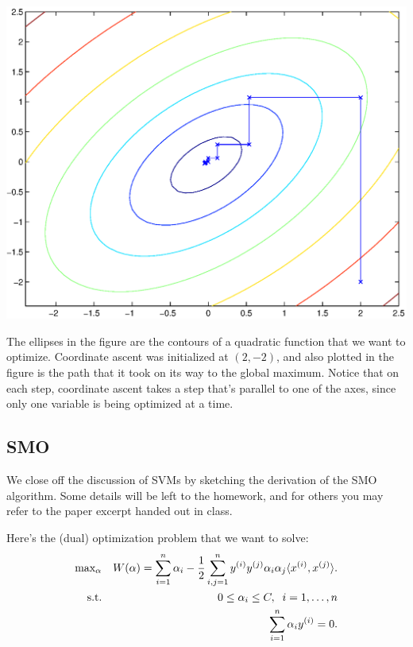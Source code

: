 \documentclass{article}
\begin{document}
\begin{center}
\includegraphics[scale=0.5]{coordinateAscent.eps}
\end{center}

The ellipses in the figure are the contours of a quadratic function that we want to optimize.
Coordinate
ascent was initialized at $(2,-2)$, and also plotted in the figure is the path that it took
on its way to the global maximum.  Notice that on each step, coordinate ascent takes a
step that's parallel to one of the axes, since only one variable is being optimized at a time.

\subsection{SMO}

We close off the discussion of SVMs by sketching the derivation of the SMO algorithm.
Some details will be left to the homework, and for others you may refer to the paper
excerpt handed out in class.

Here's the (dual) optimization problem that we want to solve:
\begin{eqnarray}
&\hbox{max}_{\alpha} & W(\alpha) =
\sum_{i=1}^{n} \alpha_i - \frac{1}{2} \sum_{i,j=1}^{n} y^{(i)} y^{(j)} \alpha_i \alpha_j \langle x^{(i)},  x^{(j)} \rangle. \\
&\;\;\;\;\hbox{s.t.}& 0 \leq \alpha_i \leq C, \;\; i=1,\ldots,{n} \label{eqn-0cconstraint} \\
&&                          \sum_{i=1}^{n} \alpha_i {y^{(i)}} = 0.   \label{eqn-bconstraint2}
\end{eqnarray}
\end{document}
